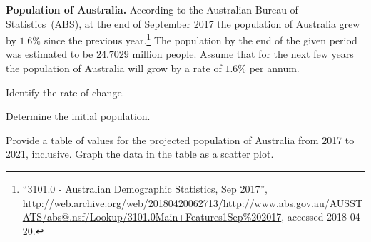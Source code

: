 \documentclass[a4paper,oneside,12pt]{article}
\begin{document}
\begin{example}
\label{eg:Australian_population_2017}
\textbf{Population of Australia.}
According to the Australian Bureau of Statistics~(ABS), at the end of
September 2017 the population of Australia grew by $1.6\%$ since the
previous year.\footnote{
  ``3101.0 - Australian Demographic Statistics, Sep 2017'',
  \url{http://web.archive.org/web/20180420062713/http://www.abs.gov.au/AUSSTATS/abs@.nsf/Lookup/3101.0Main+Features1Sep\%202017},
  accessed 2018-04-20.
}
The population by the end of the given period was estimated to be
$24.7029$ million people.  Assume that for the next few years the
population of Australia will grow by a rate of $1.6\%$ per annum.
\begin{packedenum}
\item\label{subeg:Australian_population_2017_growth_rate}
  Identify the rate of change.

\item\label{subeg:Australian_population_2017_initial_population}
  Determine the initial population.

\item\label{subeg:Australian_population_2017_table_graph}
  Provide a table of values for the projected population of Australia
  from 2017 to 2021, inclusive.  Graph the data in the table as a
  scatter plot.
\end{packedenum}
\end{example}
\end{document}

